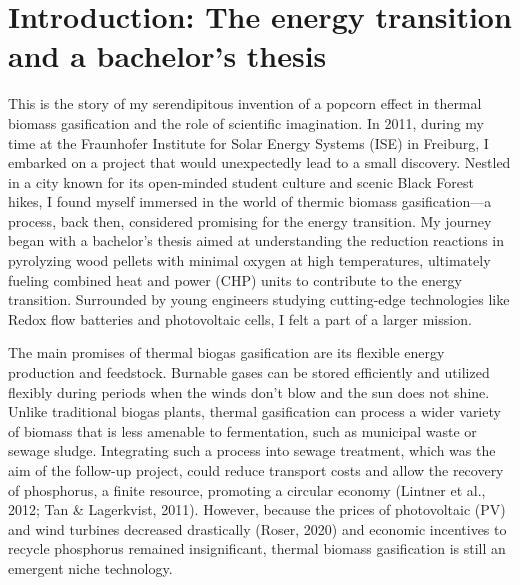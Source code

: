 \documentclass[authordate, anecdote]{jote-new-article}
\author[1]{\mbox{Maximilian Roßmann\orcid{0000-0002-0499-030X}}}
\affil[1]{Maastricht University, Maastricht, the Netherlands}
\begin{document}
\begin{frontmatter}
  \maketitle
  \begin{abstract}
    \printabstracttext
  \end{abstract}
\end{frontmatter}


	\section{Introduction: The energy transition and a bachelor's thesis}



	This is the story of my serendipitous invention of a popcorn effect in thermal biomass gasification and the role of scientific imagination. In 2011, during my time at the Fraunhofer Institute for Solar Energy Systems (ISE) in Freiburg, I embarked on a project that would unexpectedly lead to a small discovery. Nestled in a city known for its open-minded student culture and scenic Black Forest hikes, I found myself immersed in the world of thermic biomass gasification—a process, back then, considered promising for the energy transition. My journey began with a bachelor's thesis aimed at understanding the reduction reactions in pyrolyzing wood pellets with minimal oxygen at high temperatures, ultimately fueling combined heat and power (CHP) units to contribute to the energy transition. Surrounded by young engineers studying cutting-edge technologies like Redox flow batteries and photovoltaic cells, I felt a part of a larger mission.



	The main promises of thermal biogas gasification are its flexible energy production and feedstock. Burnable gases can be stored efficiently and utilized flexibly during periods when the winds don't blow and the sun does not shine. Unlike traditional biogas plants, thermal gasification can process a wider variety of biomass that is less amenable to fermentation, such as municipal waste or sewage sludge. Integrating such a process into sewage treatment, which was the aim of the follow-up project, could reduce transport costs and allow the recovery of phosphorus, a finite resource, promoting a circular economy (Lintner et al., 2012; Tan \& Lagerkvist, 2011). However, because the prices of photovoltaic (PV) and wind turbines decreased drastically (Roser, 2020) and economic incentives to recycle phosphorus remained insignificant, thermal biomass gasification is still an emergent niche technology.
\end{document}
